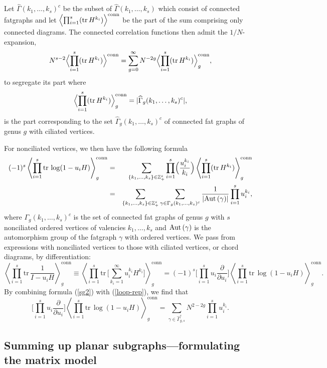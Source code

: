 \documentclass[11pt]{article}
\def\be{\begin{equation}}
\def\ee{\end{equation}}
\def\bea{\begin{eqnarray}}
\def\eea{\end{eqnarray}}
\def\tr{{\mathrm{tr\,}}}
\def\bea{\begin{eqnarray}}
\def\eea{\end{eqnarray}}
\def\beq{\begin{equation}}
\def\eeq{\end{equation}}
\theoremstyle{plain}
\theoremstyle{definition}
\def\beq{\begin{equation}}
\def\eeq{\end{equation}}
\def\bea{\begin{eqnarray}}
\def\eea{\end{eqnarray}}
\begin{document}
Let $\widehat\Gamma(k_1,\dots,k_s)^c$ be the subset of $\widehat\Gamma(k_1,\dots,k_s)$ which consist of connected fatgraphs and let
$\Bigl\langle\prod_{i=1}^s(\tr H^{k_i})\Bigr\rangle^{\mathrm{conn}}$ be the part of the sum comprising only connected diagrams.
The connected correlation functions then admit the $1/N$-expansion,
$$
N^{s-2} \Bigl\langle\prod_{i=1}^s(\tr H^{k_i})\Bigr\rangle^{\mathrm{conn}}
=\sum_{g=0}^\infty N^{-2g} \Bigl\langle\prod_{i=1}^s(\tr H^{k_i})\Bigr\rangle_g^{\mathrm{conn}},
$$
to segregate its part 
where
\be
\Bigl\langle\prod_{i=1}^s(\tr H^{k_i})\Bigr\rangle_g^{\mathrm{conn}} = 
 |\widehat\Gamma_g(k_1, \ldots, k_s)^c|, %
\label{sg2}
\ee
is the part corresponding to the set $\widehat\Gamma_g(k_1, \ldots, k_s)^c$ of
connected fat graphs of genus $g$ with ciliated vertices.

For nonciliated vertices,  we then have the following formula
\bea
(-1)^s\left\langle\prod_{i=1}^s\tr\log(1-u_iH)\right\rangle_g^{\mathrm{conn}}&=&\sum_{\{k_1,\dots,k_s\}\in {\mathbb Z}_+^s}
\prod_{i=1}^s\Bigl(\frac{u_i^{k_i}}{k_i}\Bigr)\left\langle\prod_{i=1}^s(\tr H^{k_i})\right\rangle_g^{\mathrm{conn}}\nonumber\\
&=&\sum_{\{k_1,\dots,k_s\}\in {\mathbb Z}_+^s} \sum_{\gamma \in \Gamma_g(k_1,\dots,k_s)^c} \frac {1}{|\hbox{Aut\,}(\gamma) |}
\prod_{i=1}^s u_i^{k_i},
\label{det-rep}
\eea
where $ \Gamma_g(k_1,\dots,k_s)^c$ is the set of connected fat graphs of genus $g$ with $s$ nonciliated ordered vertices of 
valencies $k_1,\ldots,k_s$ and $\hbox{Aut\,}(\gamma)$ is the automorphism group of the fatgraph $\gamma$ with ordered vertices.
We pass from expressions with nonciliated vertices to those with ciliated vertices, or chord diagrams, by differentiation:
\beq
\label{loop-rep}
\left\langle\prod_{i=1}^s\tr\frac{1}{I-u_iH}\right\rangle_g^{\mathrm{conn}}\equiv
\left\langle\prod_{i=1}^s\tr\biggl[\sum_{k_i=1}^\infty u_i^{k_i}H^{k_i}\biggr]\right\rangle_g^{\mathrm{conn}}=
(-1)^s\biggl[\prod_{i=1}^s u_i\frac{\partial}{\partial u_i}\biggr] \left\langle\prod_{i=1}^s\tr\log(1-u_iH)\right\rangle_g^{\mathrm{conn}}.
\eeq
 By combining formula (\ref{sg2}) with (\ref{loop-rep}), we find that 
 $$\biggl[\prod_{i=1}^s u_i\frac{\partial}{\partial u_i}\biggr] \left\langle\prod_{i=1}^s\tr\log(1-u_iH)\right\rangle_g^{\mathrm{conn}} = \sum_{\gamma\in \widehat\Gamma_{g,s}^c} N^{2-2g}\prod_{i=1}^s u_i^{k_i}.$$
 
 
\subsection{Summing up planar subgraphs---formulating the matrix model}
\label{ss:summinf-up}
\end{document}
